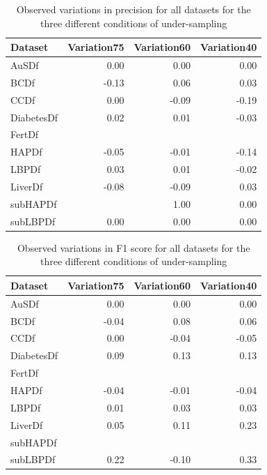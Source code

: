 \begin{table}[ht]
\centering
\begin{tabular}{lrrr}
  \hline
  \rowcolor{LightCyan}
Dataset & Variation75 & Variation60 & Variation40 \\ 
  \hline
AuSDf & 0.00 & 0.00 & 0.00 \\ 
  BCDf & -0.13 & 0.06 & 0.03 \\ 
  CCDf & 0.00 & -0.09 & -0.19 \\ 
  DiabetesDf & 0.02 & 0.01 & -0.03 \\ 
  FertDf &  &  &  \\ 
  HAPDf & -0.05 & -0.01 & -0.14 \\ 
  LBPDf & 0.03 & 0.01 & -0.02 \\ 
  LiverDf & -0.08 & -0.09 & 0.03 \\ 
  subHAPDf &  & 1.00 & 0.00 \\ 
  subLBPDf & 0.00 & 0.00 & 0.00 \\ 
   \hline
\end{tabular}
\caption{Observed variations in precision for all datasets for the three different conditions of under-sampling}
\label{tab:variationsPreci}
\end{table}

\begin{table}[ht]
\centering
\begin{tabular}{lrrr}
  \hline
  \rowcolor{LightCyan}
Dataset & Variation75 & Variation60 & Variation40 \\ 
  \hline
AuSDf & 0.00 & 0.00 & 0.00 \\ 
  BCDf & -0.04 & 0.08 & 0.06 \\ 
  CCDf & 0.00 & -0.04 & -0.05 \\ 
  DiabetesDf & 0.09 & 0.13 & 0.13 \\ 
  FertDf &  &  &  \\ 
  HAPDf & -0.04 & -0.01 & -0.04 \\ 
  LBPDf & 0.01 & 0.03 & 0.03 \\ 
  LiverDf & 0.05 & 0.11 & 0.23 \\ 
  subHAPDf &  &  &  \\ 
  subLBPDf & 0.22 & -0.10 & 0.33 \\ 
   \hline
\end{tabular}
\caption{Observed variations in F1 score for all datasets for the three different conditions of under-sampling}
\label{tab:variationsF1}
\end{table}


